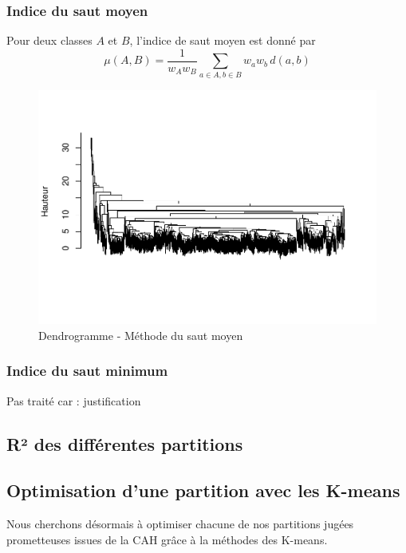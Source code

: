 \documentclass[
]{article}
\begin{document}
\hypertarget{indice-du-saut-moyen}{%
\subsubsection{Indice du saut moyen}\label{indice-du-saut-moyen}}

Pour deux classes \(A\) et \(B\), l'indice de saut moyen est donné par
\[
  \mu(A, B) = \frac{1}{w_A w_B} \sum_{a \in A, b \in B} w_a w_b \, d(a, b)
\]

\begin{figure}[H]

{\centering \includegraphics{ADM_DM2_EL_MAZZOUJI_Wahel_GILLET_Louison_files/figure-latex/DendrogrammeMoy-1} 

}

\caption{Dendrogramme - Méthode du saut moyen}\label{fig:DendrogrammeMoy}
\end{figure}

\hypertarget{indice-du-saut-minimum}{%
\subsubsection{Indice du saut minimum}\label{indice-du-saut-minimum}}

Pas traité car : justification

\hypertarget{ruxb2-des-diffuxe9rentes-partitions}{%
\subsection{R² des différentes
partitions}\label{ruxb2-des-diffuxe9rentes-partitions}}

\hypertarget{optimisation-dune-partition-avec-les-k-means}{%
\subsection{Optimisation d'une partition avec les
K-means}\label{optimisation-dune-partition-avec-les-k-means}}

Nous cherchons désormais à optimiser chacune de nos partitions jugées
prometteuses issues de la CAH grâce à la méthodes des K-means.
\end{document}
